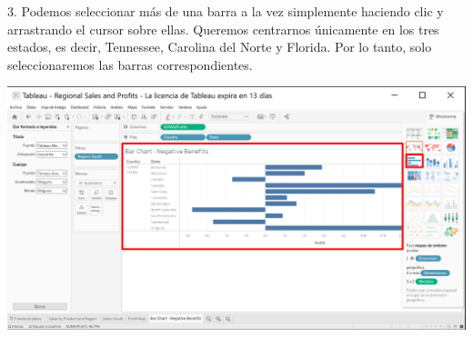 \documentclass[12pt,letterpaper]{article}
\begin{document}
3. Podemos seleccionar más de una barra a la vez simplemente haciendo clic y arrastrando el
cursor sobre ellas. Queremos centrarnos únicamente en los tres estados, es decir, Tennessee,
Carolina del Norte y Florida. Por lo tanto, solo seleccionaremos las barras correspondientes.
\begin{center}
    \includegraphics[width=16cm]{img/29.png}  
\end{center}
\end{document}
